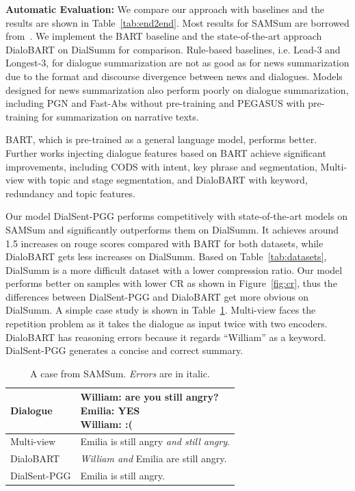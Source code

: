 \textbf{Automatic Evaluation:} We compare our approach with baselines and the results are shown in Table~\ref{tab:end2end}. Most results for SAMSum are borrowed from~\cite{feng2021survey}. We implement the BART baseline and the state-of-the-art approach DialoBART on DialSumm for comparison.
Rule-based baselines, i.e. Lead-3 and Longest-3, for dialogue summarization are not as good as for news summarization due to the format and discourse divergence between news and dialogues. 
Models designed for news summarization also perform poorly on dialogue summarization, including PGN and Fast-Abs without pre-training and PEGASUS with pre-training for summarization on narrative texts.

BART, which is pre-trained as a general language model, performs better. Further works injecting dialogue features based on BART achieve significant improvements, including CODS with intent, key phrase and segmentation, Multi-view with topic and stage segmentation, and DialoBART with keyword, redundancy and topic features. 

Our model DialSent-PGG performs competitively with state-of-the-art models on SAMSum and significantly outperforms them on DialSumm. It achieves around 1.5 increases on rouge scores compared with BART for both datasets, while DialoBART gets less increases on DialSumm. 
Based on Table~\ref{tab:datasets}, DialSumm is a more difficult dataset with a lower compression ratio. Our model performs better on samples with lower CR as shown in Figure~\ref{fig:cr}, thus the differences between DialSent-PGG and DialoBART get more obvious on DialSumm. A simple case study is shown in Table~\ref{tab:case}.  Multi-view faces the repetition problem as it takes the dialogue as input twice with two encoders. DialoBART has reasoning errors because it regards ``William'' as a keyword. DialSent-PGG generates a concise and correct summary.


\begin{table}
	\small
	\centering
	\begin{tabular}{lp{4.8cm}}
		\toprule[1pt]
		 {Dialogue}& \makecell[l]{William: are you still angry? \\Emilia: YES  \\William: :(} \\
		 \hline
		 {Multi-view}& Emilia is still angry \textit{and still angry}. \\
		 \hline
		 {DialoBART}& \textit{William and} Emilia are still angry.\\
		 \hline
		 {DialSent-PGG} &Emilia is still angry. \\
		\bottomrule[1pt]
	\end{tabular}
	\caption{A case from SAMSum. \textit{Errors} are in italic.}
	\label{tab:case}
\end{table}

